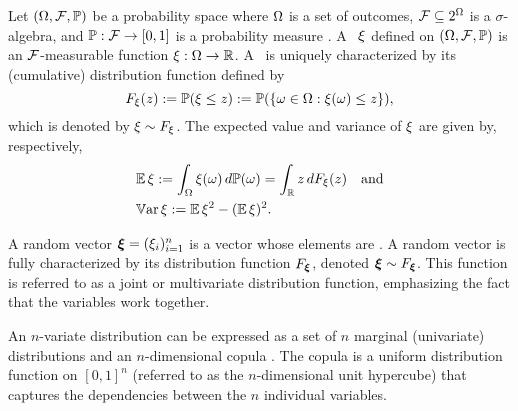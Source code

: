 Let $(\Omega, \mathcal{F}, \mathbb{P})$ be a probability space where $\Omega$ is a set of
outcomes, $\mathcal{F} \subseteq 2^\Omega$ is a $\sigma$-algebra, and
$\mathbb{P}: \mathcal{F} \to [0, 1]$ is a probability measure
\cite{durrett2010}. A \rv\ $\xi$ defined on $(\Omega, \mathcal{F}, \mathbb{P})$ is an
$\mathcal{F}$-measurable function $\xi: \Omega \to \mathbb{R}$. A \rv\ is
uniquely characterized by its (cumulative) distribution function defined by
\begin{equation*}
  F_\xi(z) := \mathbb{P}(\xi \leq z) := \mathbb{P}(\{ \omega \in \Omega: \xi(\omega) \leq z \}),
\end{equation*}
which is denoted by $\xi \sim F_\xi$. The expected value and variance
of $\xi$ are given by, respectively,
\begin{align}
  & \expectation{\h} := \int_\outcomes \h(\o) \, d\probabilityMeasure(\o) = \int_\real z \, d \distribution_\h(z) \hspace{1em} \text{and} \elab{expectation} \\
  & \variance{\h} := \expectation{\h^2} - (\expectation{\h})^2. \elab{variance}
\end{align}

A random vector $\bm{\xi} = (\xi_i)_{i = 1}^n$ is a vector whose elements are \rvs. A
random vector is fully characterized by its distribution function
$F_{\bm{\xi}}$, denoted $\bm{\xi} \sim F_{\bm{\xi}}$. This function is
referred to as a joint or multivariate distribution function, emphasizing the
fact that the variables work together.

An $n$-variate distribution can be expressed as a set of $n$ marginal
(univariate) distributions and an $n$-dimensional copula \cite{nelsen2006}. The
copula is a uniform distribution function on $[0, 1]^n$ (referred to as the
$n$-dimensional unit hypercube) that captures the dependencies between the $n$
individual variables.

